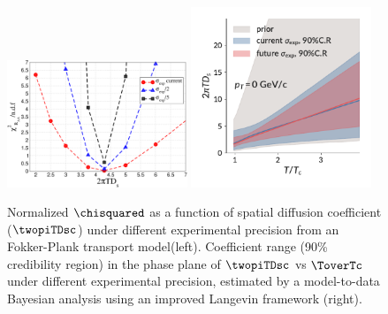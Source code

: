 \begin{figure}[ht]
	\begin{center}
		\includegraphics[width=0.48\textwidth]{hf/figures/chi_Raa_Ds.pdf}
		\includegraphics[width=0.48\textwidth]{hf/figures/Plot_posterior_D2piT_calibrate_on_Duke-central_p0.pdf}
		\caption{Normalized $\chisquared$ as a function of spatial diffusion coefficient ($\twopiTDsc$) under different experimental precision from an Fokker-Plank transport model(left). Coefficient range (90\% credibility region) in the phase plane of $\twopiTDsc$ vs $\ToverTc$ under different experimental precision, estimated by a model-to-data Bayesian analysis using an improved Langevin framework (right).}
		\label{fig:RAAv2.Dstheory}
	\end{center}
\end{figure}

